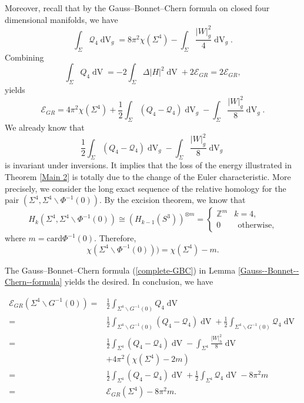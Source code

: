 \documentclass[11pt,letterpaper]{amsart}
\DeclareMathOperator{\dvol}{dV}
\newcommand{\mE}{\mathcal{E}}
\newcommand{\mQ}{\mathcal{Q}}
\newcommand{\bZ}{\mathbb{Z}}
\theoremstyle{definition}
\theoremstyle{remark}
\numberwithin{equation}{section}
\begin{document}
Moreover, recall that by the Gauss--Bonnet--Chern formula on closed four dimensional manifolds, we have
\begin{equation*}
    \int_{\Sigma}\mQ_4 \dvol_g=8\pi^2\chi(\Sigma^4)-\int_{\Sigma}\frac{|W|^2_g}{4}\dvol_g.
\end{equation*}
Combining
\begin{equation*}
    \int_{\Sigma} Q_4\dvol=-2\int_{\Sigma}\Delta |H|^2\dvol+2\mE_{GR}=2\mE_{GR},
\end{equation*} 
yields
\begin{equation*}
    \mE_{GR}=4\pi^2\chi(\Sigma^4)+\frac{1}{2}\int_{\Sigma}\left({Q}_4-{\mQ}_4\right)\dvol_g-\int_{\Sigma}\frac{|W|^2_g}{8}\dvol_g.
\end{equation*}
We already know that 
\begin{equation*}
    \frac{1}{2}\int_{\Sigma}\left({Q}_4-{\mQ}_4\right)\dvol_g-\int_{\Sigma}\frac{|W|^2_g}{8}\dvol_g
\end{equation*}
is invariant under inversions. It implies that the loss of the energy illustrated in Theorem \ref{Main 2} is totally due to the change of the Euler characteristic. More precisely, we consider the long exact sequence of the relative homology for the pair $(\Sigma^4, \Sigma^4\backslash \Phi^{-1}(0))$. By the excision theorem, we know that
\begin{equation*}
    H_k (\Sigma^4, \Sigma^4\backslash \Phi^{-1}(0))\cong \left(H_{k-1}(S^3)\right)^{\otimes m}=\left\{
    \begin{array}{cc}
        \bZ^m & k=4,  \\
        0 & ~~\mbox{otherwise},
    \end{array}
    \right. 
\end{equation*}
where $m=\mathrm{card} \Phi^{-1}(0)$. Therefore, 
\begin{equation*}
    \chi(\Sigma^4\backslash \Phi^{-1}(0)))=\chi(\Sigma^4)-m.
\end{equation*}

The Gauss--Bonnet--Chern formula (\ref{complete-GBC}) in Lemma \ref{Gauss--Bonnet--Chern--formula} yields the desired. In conclusion, we have

\begin{equation*}
\begin{split}
    \mE_{GR}(\Sigma^4\backslash G^{-1}(0))=&\frac{1}{2}\int_{\Sigma^4\backslash G^{-1}(0)} Q_4\dvol\\
    =&\frac{1}{2}\int_{\Sigma^4\backslash G^{-1}(0)}\left({Q}_4-{\mQ}_4\right)\dvol+\frac{1}{2}\int_{\Sigma^4\backslash G^{-1}(0)}{\mQ}_4\dvol\\
    =&\frac{1}{2}\int_{\Sigma^4}\left({Q}_4-{\mQ}_4\right)\dvol-\int_{\Sigma^4}\frac{|W|^2_h}{8}\dvol\\
    &+4\pi^2\left(\chi(\Sigma^4)-2m\right)\\
    =&\frac{1}{2}\int_{\Sigma^4}\left({Q}_4-{\mQ}_4\right)\dvol+\frac{1}{2}\int_{\Sigma^4}{\mQ}_4\dvol-8\pi^2m\\
    =&\mE_{GR}(\Sigma^4)-8\pi^2 m.
    \end{split}
\end{equation*}
\end{document}

